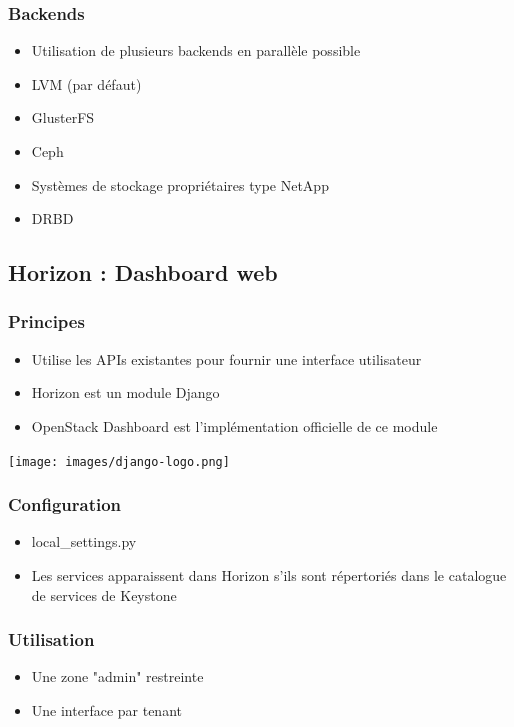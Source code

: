   \begin{frame}
    \frametitle{Backends}
    \begin{itemize}
      \item Utilisation de plusieurs backends en parallèle possible
      \item LVM (par défaut)
      \item GlusterFS
      \item Ceph
      \item Systèmes de stockage propriétaires type NetApp
      \item DRBD
    \end{itemize}
  \end{frame}

  \subsection[Horizon]{Horizon : Dashboard web}

  \begin{frame}
    \frametitle{Principes}
    \begin{itemize}
      \item Utilise les APIs existantes pour fournir une interface utilisateur
      \item Horizon est un module Django
      \item OpenStack Dashboard est l'implémentation officielle de ce module
    \end{itemize}
    \begin{center}
      \texttt{[image: images/django-logo.png]}
    \end{center}
  \end{frame}

  \begin{frame}
    \frametitle{Configuration}
    \begin{itemize}
      \item local\_settings.py
      \item Les services apparaissent dans Horizon s'ils sont répertoriés dans le catalogue de services de Keystone
    \end{itemize}
  \end{frame}

  \begin{frame}
    \frametitle{Utilisation}
    \begin{itemize}
      \item Une zone "admin" restreinte
      \item Une interface par tenant
    \end{itemize}
  \end{frame}

